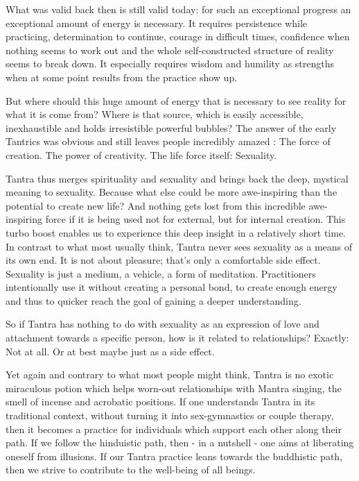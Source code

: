 What was valid back then is still valid today: for such an exceptional progress an exceptional amount of energy is necessary. It requires persistence while practicing, determination to continue, courage in difficult times, confidence when nothing seems to work out and the whole self-constructed structure of reality seems to break down. It especially requires wisdom and humility as strengths when at some point results from the practice show up.

But where should this huge amount of energy that is necessary to see reality for what it is come from? Where is that source, which is easily accessible, inexhaustible and holds irresistible powerful bubbles? The answer of the early Tantrics was obvious and still leaves people incredibly amazed : The force of creation. The power of creativity. The life force itself: Sexuality.

Tantra thus merges spirituality and sexuality and brings back the deep, mystical meaning to sexuality. Because what else could be more awe-inspiring than the potential to create new life? And nothing gets lost from this incredible awe-inspiring force if it is being used not for external, but for internal creation. This turbo boost enables us to experience this deep insight in a relatively short time. In contrast to what most usually think, Tantra never sees sexuality as a means of its own end. It is not about pleasure; that's only a comfortable side effect. Sexuality is just a medium, a vehicle, a form of meditation. Practitioners intentionally use it without creating a personal bond, to create enough energy and thus to quicker reach the goal of gaining a deeper understanding.

So if Tantra has nothing to do with sexuality as an expression of love and attachment towards a specific person, how is it related to relationships? Exactly: Not at all. Or at best maybe just as a side effect.

Yet again and contrary to what most people might think, Tantra is no exotic miraculous potion which helps worn-out relationships with Mantra singing, the smell of incense and acrobatic positions. If one understands Tantra in its traditional context, without turning it into  sex-gymnastics or couple therapy, then it becomes a practice for individuals which support each other along their path.
If we follow the hinduistic path, then - in a nutshell - one aims at liberating oneself from illusions. If our Tantra practice leans towards the buddhistic path, then we strive to contribute to the well-being of all beings.

